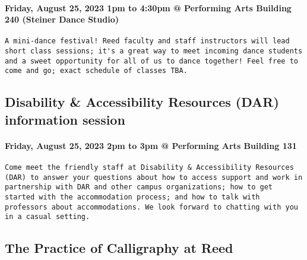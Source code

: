 \documentclass[
]{article}
\begin{document}
\hypertarget{friday-august-25-2023-1pm-to-430pm-performing-arts-building-240-steiner-dance-studio}{%
\paragraph{Friday, August 25, 2023 1pm to 4:30pm @ Performing Arts
Building 240 (Steiner Dance
Studio)}\label{friday-august-25-2023-1pm-to-430pm-performing-arts-building-240-steiner-dance-studio}}

\begin{verbatim}
A mini-dance festival! Reed faculty and staff instructors will lead short class sessions; it's a great way to meet incoming dance students and a sweet opportunity for all of us to dance together! Feel free to come and go; exact schedule of classes TBA.
\end{verbatim}

\hypertarget{disability-accessibility-resources-dar-information-session}{%
\subsection{Disability \& Accessibility Resources (DAR) information
session}\label{disability-accessibility-resources-dar-information-session}}

\hypertarget{friday-august-25-2023-2pm-to-3pm-performing-arts-building-131}{%
\paragraph{Friday, August 25, 2023 2pm to 3pm @ Performing Arts Building
131}\label{friday-august-25-2023-2pm-to-3pm-performing-arts-building-131}}

\begin{verbatim}
Come meet the friendly staff at Disability & Accessibility Resources (DAR) to answer your questions about how to access support and work in partnership with DAR and other campus organizations; how to get started with the accommodation process; and how to talk with professors about accommodations. We look forward to chatting with you in a casual setting.
\end{verbatim}

\hypertarget{the-practice-of-calligraphy-at-reed}{%
\subsection{The Practice of Calligraphy at
Reed}\label{the-practice-of-calligraphy-at-reed}}
\end{document}
